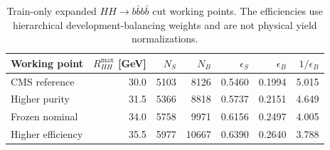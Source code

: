 \begin{table}[htbp]
\centering
\caption{Train-only expanded $HH\to b\bar b b\bar b$ cut working points. The efficiencies use hierarchical development-balancing weights and are not physical yield normalizations.}
\label{tab:hh4b_expanded_cut_working_points}
\begin{tabular}{lrrrrrr}
\toprule
Working point & $R_{HH}^{\max}$ [GeV] & $N_{S}$ & $N_{B}$ & $\epsilon_{S}$ & $\epsilon_{B}$ & $1/\epsilon_{B}$ \\
\midrule
CMS reference & 30.0 & 5103 & 8126 & 0.5460 & 0.1994 & 5.015 \\
Higher purity & 31.5 & 5366 & 8818 & 0.5737 & 0.2151 & 4.649 \\
Frozen nominal & 34.0 & 5758 & 9971 & 0.6156 & 0.2497 & 4.005 \\
Higher efficiency & 35.5 & 5977 & 10667 & 0.6390 & 0.2640 & 3.788 \\
\bottomrule
\end{tabular}
\end{table}
